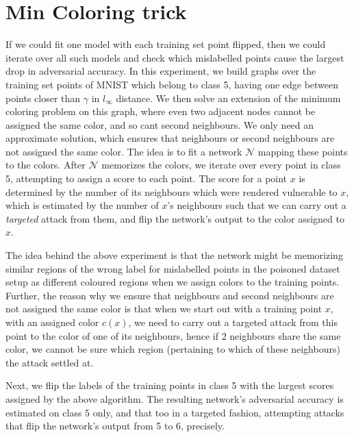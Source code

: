 \documentclass[12pt, oneside]{book}
\begin{document}
\section{Min Coloring trick}
If we could fit one model with each training set point flipped, then we could
iterate over all such models and check which mislabelled points cause the
largest drop in adversarial accuracy. In this experiment, we build graphs over
the training set points of MNIST which belong to class 5, having one edge
between points closer than $\gamma$ in $l_\infty$ distance. We then solve an
extension of the minimum coloring problem on this graph, where even two adjacent
nodes cannot be assigned the same color, and so cant second neighbours. We only
need an approximate solution, which ensures that neighbours or second neighbours
are not assigned the same color. The idea is to fit a network $\mathcal{N}$
mapping these points to the colors. After $\mathcal{N}$ memorizes the colors, we
iterate over every point in class 5, attempting to assign a score to each point.
The score for a point $x$ is determined by the number of its neighbours which
were rendered vulnerable to $x$, which is estimated by the number of $x$'s
neighbours such that we can carry out a \emph{targeted} attack from them, and
flip the network's output to the color assigned to $x$.

The idea behind the above experiment is that the network might be memorizing
similar regions of the wrong label for mislabelled points in the poisoned
dataset setup as different coloured regions when we assign colors to the
training points. Further, the reason why we ensure that neighbours and second
neighbours are not assigned the same color is that when we start out with a
training point $x$, with an assigned color $c(x)$, we need to carry out a
targeted attack from this point to the color of one of its neighbours, hence if
2 neighbours share the same color, we cannot be sure which region (pertaining to
which of these neighbours) the attack settled at.

Next, we flip the labels of the training points in class 5 with the largest
scores assigned by the above algorithm. The resulting network's adversarial
accuracy is estimated on class 5 only, and that too in a targeted fashion, attempting attacks that flip the network's output from 5 to 6, precisely.
\end{document}
